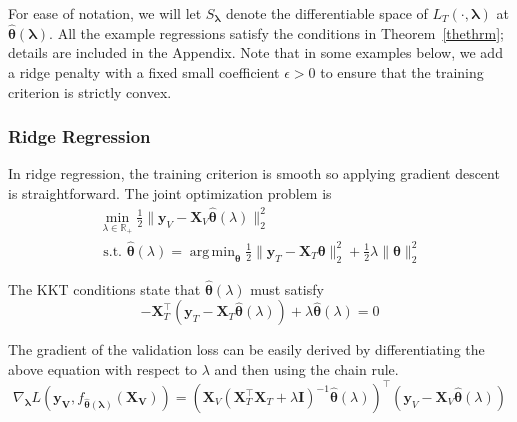 \documentclass{statsoc}
\DeclareMathOperator*{\argmin}{arg\,min}
\begin{document}
For ease of notation, we will let $S_{\boldsymbol{\lambda}}$ denote the differentiable space of $L_T(\cdot, \boldsymbol{\lambda})$ at $\hat{\boldsymbol{\theta}}(\boldsymbol{\lambda})$. All the example regressions satisfy the conditions in Theorem~\ref{thethrm}; details are included in the Appendix. Note that in some examples below, we add a ridge penalty with a fixed small coefficient $\epsilon > 0$ to ensure that the training criterion is strictly convex.

\subsubsection{Ridge Regression}

In ridge regression, the training criterion is smooth so applying gradient descent is straightforward. The joint optimization problem is
\begin{equation}
\begin{array}{c}
\min_{\lambda\in \mathbb{R}_{+}} \frac{1}{2} \| \boldsymbol{y}_V - \boldsymbol{X}_V \hat{\boldsymbol{\theta}} (\lambda) \|_2 ^2 \\
\text{  s.t.  } \hat{\boldsymbol{\theta}} (\lambda) = \argmin_{\boldsymbol{\theta}} \frac{1}{2} \| \boldsymbol{y}_T - \boldsymbol{X}_T \boldsymbol{\theta} \|_2 ^2 + \frac{1}{2} \lambda \| \boldsymbol{\theta} \|_2^2
\end{array}
\end{equation}

The KKT conditions state that $\hat{\boldsymbol{\theta}}(\lambda)$ must satisfy
\begin{equation}
-\boldsymbol{X}_T^\top (\boldsymbol{y}_T - \boldsymbol{X}_T \hat{\boldsymbol{\theta}} (\lambda)) + \lambda \hat{\boldsymbol{\theta}} (\lambda) = 0
\end{equation}

The gradient of the validation loss can be easily derived by differentiating the above equation with respect to $\lambda$ and then using the chain rule.
\begin{equation}
\nabla_{\boldsymbol \lambda} L(\boldsymbol{y_V}, f_{\hat {\boldsymbol \theta}(\boldsymbol \lambda)}(\boldsymbol{X_V}))
= (\boldsymbol{X}_V(\boldsymbol{X}_T^\top \boldsymbol{X}_T + \lambda \boldsymbol{I})^{-1}
\hat{\boldsymbol{\theta}}(\lambda))^{\top}
(\boldsymbol{y}_V - \boldsymbol{X}_V \hat{\boldsymbol{\theta}}(\lambda))
\end{equation}
\end{document}
